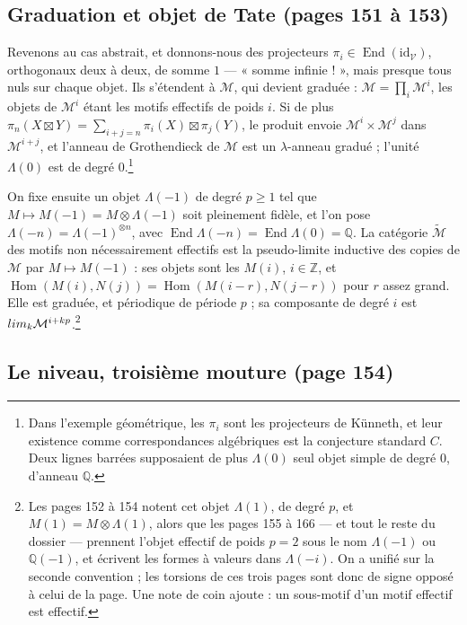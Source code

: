 \documentclass[11pt,a4paper]{article}
\begin{document}
\subsection*{Graduation et objet de Tate (pages 151 à 153)}

Revenons au cas abstrait, et donnons-nous des projecteurs $\pi_{i} \in
\operatorname{End}(\mathrm{id}_{\mathcal{V}})$, orthogonaux deux à deux, de somme
$1$ --- « somme infinie ! », mais presque tous nuls sur chaque objet. Ils s'étendent à
$\mathcal{M}$, qui devient graduée : $\mathcal{M} = \prod_{i} \mathcal{M}^{i}$, les
objets de $\mathcal{M}^{i}$ étant les motifs effectifs de poids $i$. Si de plus
$\pi_{n}(X \boxtimes Y) = \sum_{i+j=n} \pi_{i}(X) \boxtimes \pi_{j}(Y)$, le produit
envoie $\mathcal{M}^{i} \times \mathcal{M}^{j}$ dans $\mathcal{M}^{i+j}$, et l'anneau
de Grothendieck de $\mathcal{M}$ est un $\lambda$-anneau gradué ; l'unité
$\Lambda(0)$ est de degré $0$.\footnote{Dans l'exemple géométrique, les $\pi_{i}$
sont les projecteurs de Künneth, et leur existence comme correspondances
algébriques est la conjecture standard $C$. Deux lignes barrées supposaient de plus
$\Lambda(0)$ seul objet simple de degré $0$, d'anneau $\mathbb{Q}$.}

On fixe ensuite un objet $\Lambda(-1)$ de degré $p \geqslant 1$ tel que $M \mapsto
M(-1) = M \otimes \Lambda(-1)$ soit pleinement fidèle, et l'on pose $\Lambda(-n) =
\Lambda(-1)^{\otimes n}$, avec $\operatorname{End}\Lambda(-n) =
\operatorname{End}\Lambda(0) = \mathbb{Q}$. La catégorie $\widetilde{\mathcal{M}}$ des
motifs non nécessairement effectifs est la pseudo-limite inductive des copies de
$\mathcal{M}$ par $M \mapsto M(-1)$ : ses objets sont les $M(i)$, $i \in \mathbb{Z}$,
et $\operatorname{Hom}(M(i), N(j)) = \operatorname{Hom}(M(i-r), N(j-r))$ pour $r$
assez grand. Elle est graduée, et périodique de période $p$ ; sa composante de
degré $i$ est $\varinjlim_{k}\mathcal{M}^{i+kp}$.\footnote{Les pages 152 à 154 notent
cet objet $\Lambda(1)$, de degré $p$, et $M(1) = M \otimes \Lambda(1)$, alors que les
pages 155 à 166 --- et tout le reste du dossier --- prennent l'objet effectif de
poids $p = 2$ sous le nom $\Lambda(-1)$ ou $\mathbb{Q}(-1)$, et écrivent les formes
à valeurs dans $\Lambda(-i)$. On a unifié sur la seconde convention ; les torsions
de ces trois pages sont donc de signe opposé à celui de la page. Une note de coin
ajoute : un sous-motif d'un motif effectif est effectif.}

\subsection*{Le niveau, troisième mouture (page 154)}
\end{document}
